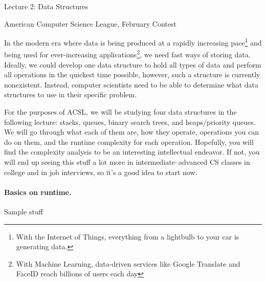 \documentclass[10pt]{article}
\begin{document}
    \noindent
    \begin{center}

        \hrulefill

        \vspace{5pt}

        \vspace{0pt}

        {\Large \hfill  Lecture 2: Data Structures\hfill}
        \vspace{10pt}

        {\large \hfill  American Computer Science League, February Contest\hfill}
        \vspace{10pt}


        \vspace{-3pt}
        \hrulefill
    \end{center}

In the modern era where data is being produced at a rapidly increasing
pace\footnote{With the Internet of Things, everything from a lightbulb
to your car is generating data.}
and being used for ever-increasing
applications\footnote{With Machine Learning, data-driven services like Google Translate and
FaceID reach billions of users each day},
we need fast ways of storing data.
Ideally, we could develop one data structure to hold all types of data
and perform all operations in the quickest time possible, however,
such a structure is currently nonexistent.
Instead, computer scientists need to be able to determine what
data structures to use in their specific problem.

For the purposes of ACSL, we will be studying four data structures
in the following lecture: stacks, queues, binary search trees, and
heaps/priority queues.
We will go through what each of them are, how they operate,
operations you can do on them, and the runtime complexity for each operation.
Hopefully, you will find the complexity analysis to be an interesting intellectual endeavor.
If not, you will end up seeing this stuff a lot more in intermediate--advanced CS
classes in college and in job interviews, so it's a good idea to start now.

\paragraph{Basics on runtime.}
Sample stuff
\end{document}

